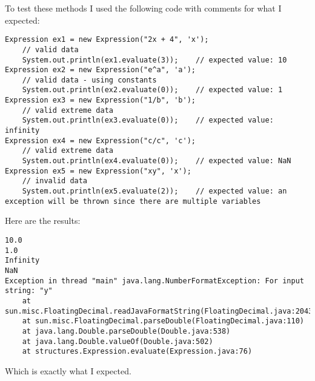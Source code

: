 \documentclass[../../../../../main.tex]{subfiles}
\begin{document}
To test these methods I used the following code with comments for what I expected:
\begin{verbatim}
Expression ex1 = new Expression("2x + 4", 'x');
	// valid data
	System.out.println(ex1.evaluate(3));	// expected value: 10
Expression ex2 = new Expression("e^a", 'a');
	// valid data - using constants
	System.out.println(ex2.evaluate(0));	// expected value: 1
Expression ex3 = new Expression("1/b", 'b');
	// valid extreme data
	System.out.println(ex3.evaluate(0));	// expected value: infinity
Expression ex4 = new Expression("c/c", 'c');
	// valid extreme data
	System.out.println(ex4.evaluate(0));	// expected value: NaN
Expression ex5 = new Expression("xy", 'x');
	// invalid data
	System.out.println(ex5.evaluate(2));	// expected value: an exception will be thrown since there are multiple variables
\end{verbatim}
Here are the results:
\begin{verbatim}
10.0
1.0
Infinity
NaN
Exception in thread "main" java.lang.NumberFormatException: For input string: "y"
	at sun.misc.FloatingDecimal.readJavaFormatString(FloatingDecimal.java:2043)
	at sun.misc.FloatingDecimal.parseDouble(FloatingDecimal.java:110)
	at java.lang.Double.parseDouble(Double.java:538)
	at java.lang.Double.valueOf(Double.java:502)
	at structures.Expression.evaluate(Expression.java:76)
\end{verbatim}
Which is exactly what I expected.
\newpage
\end{document}
